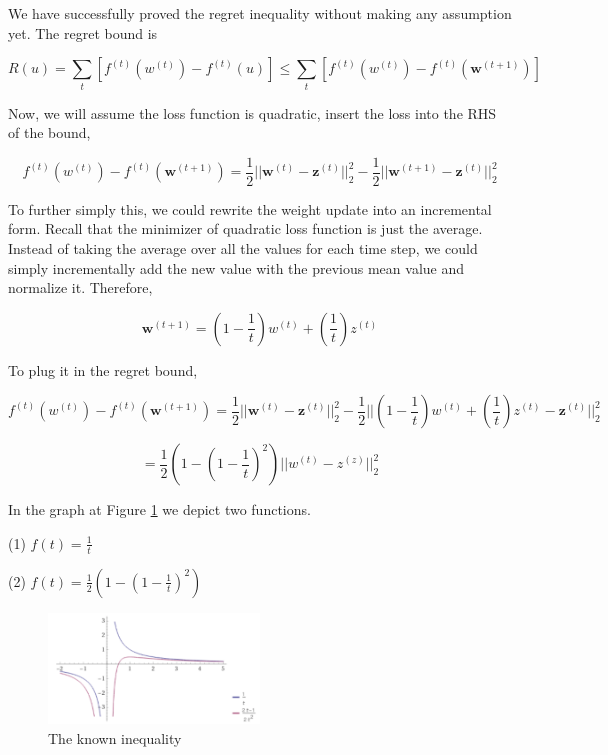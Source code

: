 \documentclass[11pt]{article}
\begin{document}
We have successfully proved the regret inequality without making any assumption yet. The regret bound is

\begin{equation*}
    R(u) = \sum_t [f^{(t)} (w^{(t)}) - f^{(t)}(u)] \leq \sum_t [f^{(t)} (w^{(t)}) - f^{(t)}(\bm{w}^{(t+1)})]
\end{equation*}

Now, we will assume the loss function is quadratic, insert the loss into the RHS of the bound,

\begin{equation*}
    f^{(t)} (w^{(t)}) - f^{(t)}(\bm{w}^{(t+1)}) = \frac{1}{2}||\bm{w}^{(t)} - \bm{z}^{(t)}||_2^2 - \frac{1}{2}||\bm{w}^{(t+1)} - \bm{z}^{(t)}||_2^2
\end{equation*}

To further simply this, we could rewrite the weight update into an incremental form. Recall that the minimizer of quadratic loss function is just the average. Instead of taking the average over all the values for each time step, we could simply incrementally add the new value with the previous mean value and normalize it. Therefore,

\begin{equation*}
    \bm{w}^{(t+1)} = (1- \frac{1}{t})w^{(t)} + ( \frac{1}{t}) z^{(t)}
\end{equation*}

To plug it in the regret bound,

\begin{equation*}
    f^{(t)} (w^{(t)}) - f^{(t)}(\bm{w}^{(t+1)}) = \frac{1}{2}||\bm{w}^{(t)} - \bm{z}^{(t)}||_2^2 - \frac{1}{2}||(1- \frac{1}{t})w^{(t)} + ( \frac{1}{t}) z^{(t)} - \bm{z}^{(t)}||_2^2
\end{equation*}

\begin{equation*}
    = \frac{1}{2}(1-(1-\frac{1}{t})^2)||w^{(t)} - z^{(z)}||_2^2
\end{equation*}

In the graph at Figure \ref{fig:ftrl_examples} we depict two functions.

\begin{center}
(1) $f(t) = \frac{1}{t}$

(2) $f(t) = \frac{1}{2}(1-(1-\frac{1}{t})^2)$
\end{center}

\begin{figure}[h]
    \centering
    \includegraphics[width=0.5\textwidth]{figures/quadratic.png}
    \caption{The known inequality}
    \label{fig:ftrl_examples}
\end{figure}
\end{document}
